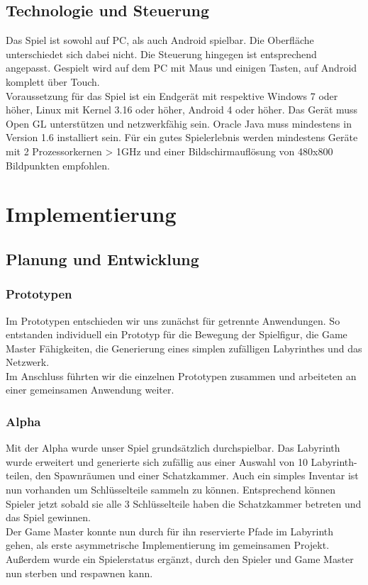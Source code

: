 \documentclass[10pt,a4paper,notitlepage]{scrreprt}
\begin{document}
		\section{Technologie und Steuerung}
		Das Spiel ist sowohl auf PC, als auch Android spielbar. Die Oberfläche unterschiedet sich dabei nicht. Die Steuerung hingegen ist entsprechend angepasst. Gespielt wird auf dem PC mit Maus und einigen Tasten, auf Android komplett über Touch.\\
		Voraussetzung für das Spiel ist ein Endgerät mit respektive Windows 7 oder höher, Linux mit Kernel 3.16 oder höher, Android 4 oder höher. Das Gerät muss Open GL unterstützen und netzwerkfähig sein. Oracle Java muss mindestens in Version 1.6 installiert sein. Für ein gutes Spielerlebnis werden mindestens Geräte mit 2 Prozessorkernen > 1GHz und einer Bildschirmauflösung von 480x800 Bildpunkten empfohlen.\\
	
	\chapter{Implementierung}
		\section{Planung und Entwicklung}
			\subsection{ Prototypen}
			Im Prototypen entschieden wir uns zunächst für getrennte Anwendungen. So entstanden individuell ein Prototyp für die Bewegung der Spielfigur, die Game Master Fähigkeiten, die Generierung eines simplen zufälligen Labyrinthes und das Netzwerk.\\
			Im Anschluss führten wir die einzelnen Prototypen zusammen und arbeiteten an einer gemeinsamen Anwendung weiter.\\
			
			\subsection{Alpha}
			
			Mit der Alpha wurde unser Spiel grundsätzlich durchspielbar. Das Labyrinth wurde erweitert und generierte sich zufällig aus einer Auswahl von 10 Labyrinth-teilen, den Spawnräumen und einer Schatzkammer. Auch ein simples Inventar ist nun vorhanden um Schlüsselteile sammeln zu können. Entsprechend können Spieler jetzt sobald sie alle 3 Schlüsselteile haben die Schatzkammer betreten und das Spiel gewinnen.\\
			Der Game Master konnte nun durch für ihn reservierte Pfade im Labyrinth gehen, als erste asymmetrische Implementierung im gemeinsamen Projekt.\\
			Außerdem wurde ein Spielerstatus ergänzt, durch den Spieler und Game Master nun sterben und respawnen kann.\\
			
\end{document}
